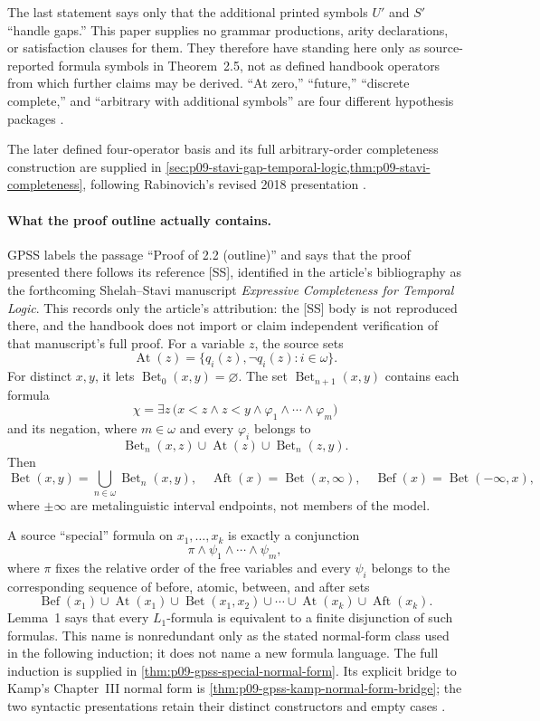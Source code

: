 The last statement says only that the additional printed symbols \(U'\)
and \(S'\) ``handle gaps.''  This paper supplies no grammar productions,
arity declarations, or satisfaction clauses for them.  They therefore have
standing here only as source-reported formula symbols in Theorem~2.5, not as
defined handbook operators from which further claims may be derived.  ``At
zero,'' ``future,'' ``discrete complete,'' and
``arbitrary with additional symbols'' are four different hypothesis packages
\cite[pp.~168--171]{GabbayPnueliShelahStavi1980}.

The later defined four-operator basis and its full arbitrary-order
completeness construction are supplied in
\cref{sec:p09-stavi-gap-temporal-logic,thm:p09-stavi-completeness},
following Rabinovich's revised 2018 presentation
\cite{Rabinovich2018Stavi}.

\paragraph{What the proof outline actually contains.}
GPSS labels the passage ``Proof of 2.2 (outline)'' and says that the proof
presented there follows its reference [SS], identified in the article's
bibliography as the forthcoming Shelah--Stavi manuscript
\emph{Expressive Completeness for Temporal Logic}.  This records only the
article's attribution: the [SS] body is not reproduced there, and the handbook
does not import or claim independent verification of that manuscript's full
proof.
For a variable \(z\), the source sets
\[
 \operatorname{At}(z)
 =\{q_i(z),\neg q_i(z):i\in\omega\}.
\]
For distinct \(x,y\), it lets \(\operatorname{Bet}_0(x,y)=\varnothing\).
The set \(\operatorname{Bet}_{n+1}(x,y)\) contains each formula
\[
 \chi=\exists z\,
 \bigl(x<z\land z<y\land
       \varphi_1\land\cdots\land\varphi_m\bigr)
\]
and its negation, where \(m\in\omega\) and every \(\varphi_i\) belongs to
\[
 \operatorname{Bet}_n(x,z)\cup
 \operatorname{At}(z)\cup
 \operatorname{Bet}_n(z,y).
\]
Then
\[
 \operatorname{Bet}(x,y)=\bigcup_{n\in\omega}\operatorname{Bet}_n(x,y),
 \quad
 \operatorname{Aft}(x)=\operatorname{Bet}(x,\infty),
 \quad
 \operatorname{Bef}(x)=\operatorname{Bet}(-\infty,x),
\]
where \(\pm\infty\) are metalinguistic interval endpoints, not members of the
model.

A source ``special'' formula on \(x_1,\ldots,x_k\) is exactly a conjunction
\[
 \pi\land\psi_1\land\cdots\land\psi_m,
\]
where \(\pi\) fixes the relative order of the free variables and every
\(\psi_i\) belongs to the corresponding sequence of before, atomic, between,
and after sets
\[
 \operatorname{Bef}(x_1)\cup\operatorname{At}(x_1)\cup
 \operatorname{Bet}(x_1,x_2)\cup\cdots\cup
 \operatorname{At}(x_k)\cup\operatorname{Aft}(x_k).
\]
Lemma~1 says that every \(L_1\)-formula is equivalent to a finite disjunction
of such formulas.  This name is nonredundant only as the stated normal-form
class used in the following induction; it does not name a new formula
language. The full induction is supplied in
\cref{thm:p09-gpss-special-normal-form}. Its explicit bridge to Kamp's
Chapter~III normal form is
\cref{thm:p09-gpss-kamp-normal-form-bridge}; the two syntactic
presentations retain their distinct constructors and empty cases
\cite[ch.~III]{Kamp1968}.

